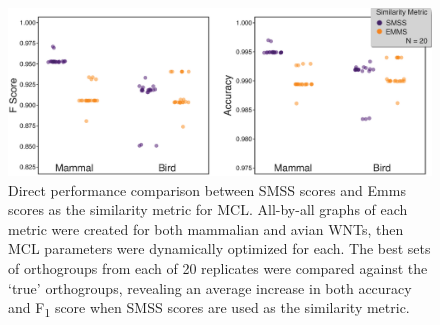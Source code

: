 \documentclass[twocolumn]{bmcart}  %
\begin{document}
\begin{figure}[t]
  \begin{center}
  \includegraphics[height=0.20\textheight]{../figures/emms_vs_smss.eps}
\end{center}
\caption{Direct performance comparison between SMSS scores and Emms scores as the similarity metric for MCL. All-by-all graphs of each metric were created for both mammalian and avian WNTs, then MCL parameters were dynamically optimized for each. The best sets of orthogroups from each of 20 replicates were compared against the `true' orthogroups, revealing an average increase in both accuracy and F\textsubscript{1} score when SMSS scores are used as the similarity metric.}
\label{fig:emms_vs_smss}
\end{figure}
\end{document}
